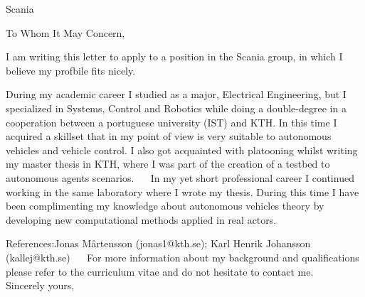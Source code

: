 \documentclass{scrlttr2}
\renewcommand{\\}{\ {\large\textperiodcentered}\ }
\begin{document}

\begin{letter}{ %
Scania
}


\opening{To Whom It May Concern,}


I am writing this letter to apply to a position in the Scania group, in which I believe my profbile fits nicely.

During my academic career I studied as a major, Electrical Engineering, but I specialized in Systems, Control and Robotics while doing a double-degree in a cooperation between a portuguese university (IST) and KTH. In this time I acquired a skillset that in my point of view is very suitable to autonomous vehicles and vehicle control. I also got acquainted with platooning whilst writing my master thesis in KTH, where I was part of the creation of a testbed to autonomous agents scenarios. 
\\
In my yet short professional career I continued working in the same laboratory where I wrote my thesis. During this time I have been complimenting my knowledge about autonomous vehicles theory by developing new computational methods applied in real actors. 

References:Jonas Mårtensson (jonas1@kth.se); Karl Henrik Johansson (kallej@kth.se)
\\
For more information about my background and qualifications please refer to the curriculum vitae and do not hesitate to contact me.
\\
\\
Sincerely yours, \\


\end{letter}
\end{document}

